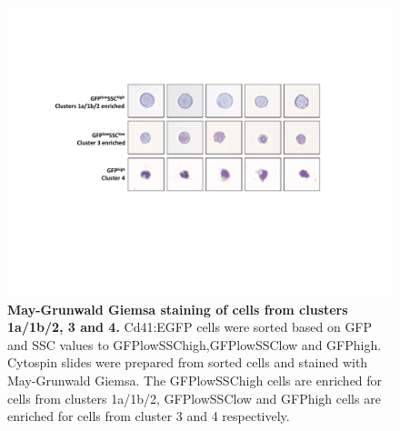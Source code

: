 \begin{figure}
    \centering
    \includegraphics[width=\textwidth]{"SF5"}
    \caption[May-Grunwald Giemsa staining of cells from clusters 1a/1b/2, 3 and 4]{\textbf{May-Grunwald Giemsa staining of cells from clusters 1a/1b/2, 3 and 4.} Cd41:EGFP cells were sorted based on GFP and SSC values to GFPlowSSChigh,GFPlowSSClow and GFPhigh. Cytospin slides were prepared from sorted cells and stained with May-Grunwald Giemsa. The GFPlowSSChigh cells are enriched for cells from clusters 1a/1b/2, GFPlowSSClow and GFPhigh cells are enriched for cells from cluster 3 and 4 respectively.}
    \label{fig:cytospin}
\end{figure}

